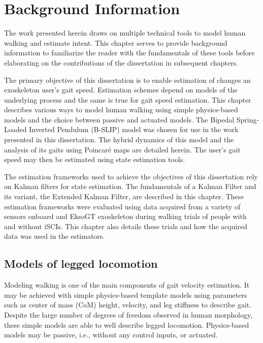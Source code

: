 \chapter{Background Information}\label{chapter:bg_info}

The work presented herein draws on multiple technical tools to model human walking and estimate intent. This chapter serves to provide background information to familiarize the reader with the fundamentals of these tools before elaborating on the contributions of the dissertation in subsequent chapters. 

The primary objective of this dissertation is to enable estimation of changes an exoskeleton user's gait speed. Estimation schemes depend on models of the underlying process and the same is true for gait speed estimation. This chapter describes various ways to model human walking using simple physics-based models and the choice between passive and actuated models. The Bipedal Spring-Loaded Inverted Pendulum (B-SLIP) model was chosen for use in the work presented in this dissertation. The hybrid dynamics of this model and the analysis of its gaits using Poincar\'e maps are detailed herein. The user's gait speed may then be estimated using state estimation tools.

The estimation frameworks used to achieve the objectives of this dissertation rely on Kalman filters for state estimation. The fundamentals of a Kalman Filter and its variant, the Extended Kalman Filter, are described in this chapter. These estimation frameworks were evaluated using data acquired from a variety of sensors onboard and EksoGT exoskeleton during walking trials of people with and without iSCIs. This chapter also details these trials and how the acquired data was used in the estimators.

\section{Models of legged locomotion}

Modeling walking is one of the main components of gait velocity estimation. It may be achieved with simple physics-based template models using parameters such as center of mass (CoM) height, velocity, and leg stiffness to describe gait. Despite the large number of degrees of freedom observed in human morphology, these simple models are able to well describe legged locomotion. Physics-based models may be passive, i.e., without any control inputs, or actuated.  

